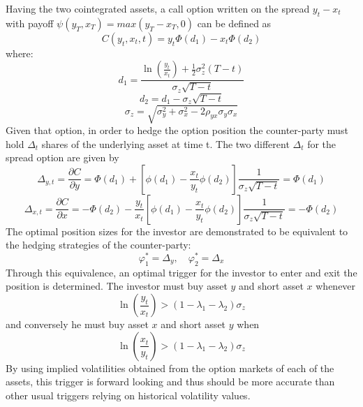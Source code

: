 Having the two cointegrated assets, a call option written on the spread $y_t - x_t$ with payoff $\psi(y_T, x_T)=max(y_T-x_T,0)$ can be defined as 
\begin{equation}
    C(y_t,x_t,t)=y_t \Phi(d_1)-x_t \Phi(d_2)
    \label{spread_option}
\end{equation}
where:
\begin{equation}
    \label{e:calc-d1}
    d_1=\frac{\ln\left(\frac{y_t}{x_t}\right)+\frac{1}{2}\sigma^2_z(T-t)}{\sigma_z \sqrt{T-t}}
\end{equation}
\begin{equation}
    d_2=d_1-\sigma_z \sqrt{T-t}
\end{equation}
\begin{equation}
    \sigma_z=\sqrt{\sigma_y^2+ \sigma_x^2-2\rho_{yx}\sigma_y\sigma_x}
\end{equation}
Given that option, in order to hedge the option position the counter-party must hold $\Delta_t$ shares of the underlying asset at time t. The two different $\Delta_t$ for the spread option are given by 
\begin{equation}
    \label{e:position-size-model-1}
    \Delta_{y,t} = \frac{\partial C}{\partial y} = \Phi(d_1)+\left[\phi(d_1)-\frac{x_t}{y_t}\phi(d_2)\right] \frac{1}{\sigma_z \sqrt{T-t}}=\Phi(d_1)
\end{equation}
\begin{equation}
    \label{e:position-size-model-2}
    \Delta_{x,t} = \frac{\partial C}{\partial x} = -\Phi(d_2)-\frac{y_t}{x_t}\left[\phi(d_1)-\frac{x_t}{y_t}\phi(d_2)\right] \frac{1}{\sigma_z \sqrt{T-t}}=-\Phi(d_2)
\end{equation}
The optimal position sizes for the investor are demonstrated to be equivalent to the hedging strategies of the counter-party:
\begin{equation}
    \label{e:position-sizes}
    \varphi^*_1=\Delta_y,\quad \varphi^*_2=\Delta_x
\end{equation}
Through this equivalence, an optimal trigger for the investor to  enter and exit the position is determined. The investor must buy asset $y$ and short asset $x$ whenever 
\begin{equation}
    \label{e:trigger-1}
    \ln\left(\frac{y_t}{x_t}\right) > (1-\lambda_1 - \lambda_2)\sigma_z
\end{equation}
and conversely he must buy asset $x$ and short asset $y$ when
\begin{equation}
    \ln\left(\frac{x_t}{y_t}\right) > (1-\lambda_1 - \lambda_2)\sigma_z
\end{equation}
By using implied volatilities obtained from the option markets of each of the assets, this trigger is forward looking and thus should be more accurate than other usual triggers relying on historical volatility values. 

